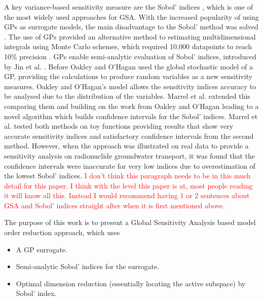 \documentclass[preprint,12pt]{elsarticle}
\begin{document}
        A key variance-based sensitivity measure are the Sobol' indices \cite{Sobol2001}, which is one of the most widely used approaches for GSA. With the increased popularity of using GPs as surrogate models, the main disadvantage to the Sobol' method was solved \cite{Oakley.OHagan2004,Jin.etal2004,Marrel.etal2009}. The use of GPs provided an alternative method to estimating multidimensional integrals using Monte Carlo schemes, which required 10,000 datapoints to reach 10\% precision \cite{Lamoureux.etal2014}. GPs enable semi-analytic evaluation of Sobol' indices, introduced by Jin et al. \cite{Jin.etal2004}. Before Oakley and O'Hagan \cite{Oakley.OHagan2004} used the global stochastic model of a GP, providing the calculations to produce random variables as a new sensitivity measures. Oakley and O'Hagan's \cite{Oakley.OHagan2004} model allows the sensitivity indices accuracy to be analysed due to the distribution of the variables. Marrel et al. \cite{Marrel.etal2009} extended this comparing them and building on the work from Oakley and O'Hagan \cite{Oakley.OHagan2004} leading to a novel algorithm which builds confidence intervals for the Sobol' indices. Marrel et al. \cite{Marrel.etal2009} tested both methods on toy functions providing results that show very accurate sensitivity indices and satisfactory confidence intervals from the second method. However, when the approach was illustrated on real data to provide a sensitivity analysis on radionuclide groundwater transport, it was found that the confidence intervals were inaccurate for very low indices due to overestimation of the lowest Sobol' indices. \textcolor{red}{I don't think this paragraph needs to be in this much detail for this paper. I think with the level this paper is at, most people reading it will know all this. Instead I would recommend having 1 or 2 sentences about GSA and Sobol' indices straight after when it is first mentioned above.}

        The purpose of this work is to present a Global Sensitivity Analysis based model order reduction approach, which uses 
        \begin{itemize}
            \item A GP surrogate.
            \item Semi-analytic Sobol' indices for the surrogate.
            \item Optimal dimension reduction (essentially locating the active subspace) by Sobol' index.
        \end{itemize}
\end{document}
